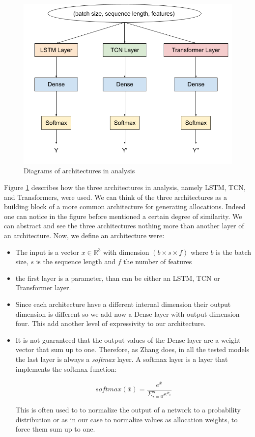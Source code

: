 \begin{figure}[h]
    \centering
    \includegraphics[width=\textwidth]{cap4/architectures.png}
    \caption{Diagrams of architectures in analysis}
    \label{fig:architectures}
\end{figure}

\hfill \break
Figure \ref{fig:architectures} describes how the three architectures in analysis, namely LSTM, TCN, and Transformers, were used. We can think of the three architectures as a building block of a more common architecture for generating allocations. Indeed one can notice in the figure before mentioned a certain degree of similarity. We can abstract and see the three architectures nothing more than another layer of an architecture. Now, we define an architecture were: \begin{itemize}
\item The input is a vector $x \in \mathbb{R}^3$ with dimension $(b \times s \times f)$ where $b$ is the batch size, $s$ is the sequence length and $f$ the number of features
\item the first layer is a parameter, than can be either an LSTM, TCN or Transformer layer.
\item Since each architecture have a different internal dimension their output dimension is different so we add now a Dense layer with output dimension four. This add another level of expressivity to our architecture.

\item It is not guaranteed that the output values of the Dense layer are a weight vector that sum up to one. Therefore, as Zhang \cite{Zhang_2020} does, in all the tested models the last layer is always a \textit{softmax} layer. A softmax layer is a layer that implements the softmax function:

$$ softmax(\bar{x}) = \frac{e^{\bar{x}}}{\Sigma_{i=0}^n e^{\bar{x}_i}}  $$

This is often used to to normalize the output of a network to a probability distribution or as in our case to normalize values as allocation weights, to force them sum up to one.

\end{itemize}

